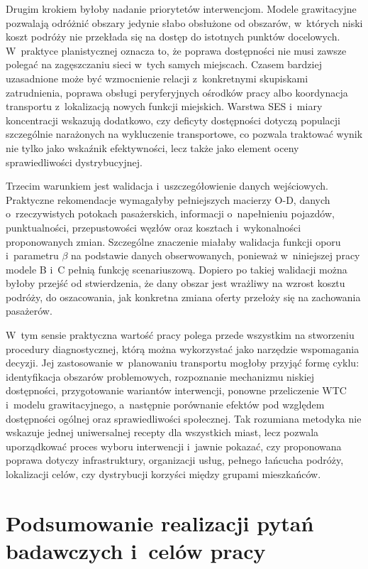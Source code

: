 \documentclass{pracamgr}
\begin{document}
Drugim krokiem byłoby nadanie priorytetów interwencjom. Modele grawitacyjne pozwalają odróżnić obszary jedynie słabo obsłużone od obszarów, w~których niski koszt podróży nie przekłada się na dostęp do istotnych punktów docelowych. W~praktyce planistycznej oznacza to, że poprawa dostępności nie musi zawsze polegać na zagęszczaniu sieci w~tych samych miejscach. Czasem bardziej uzasadnione może być wzmocnienie relacji z~konkretnymi skupiskami zatrudnienia, poprawa obsługi peryferyjnych ośrodków pracy albo koordynacja transportu z~lokalizacją nowych funkcji miejskich. Warstwa \mbox{SES} i~miary koncentracji wskazują dodatkowo, czy deficyty dostępności dotyczą populacji szczególnie narażonych na wykluczenie transportowe, co pozwala traktować wynik nie tylko jako wskaźnik efektywności, lecz także jako element oceny sprawiedliwości dystrybucyjnej.

Trzecim warunkiem jest walidacja i~uszczegółowienie danych wejściowych. Praktyczne rekomendacje wymagałyby pełniejszych macierzy \mbox{O-D}, danych o~rzeczywistych potokach pasażerskich, informacji o~napełnieniu pojazdów, punktualności, przepustowości węzłów oraz kosztach i~wykonalności proponowanych zmian. Szczególne znaczenie miałaby walidacja funkcji oporu i~parametru $\beta$ na podstawie danych obserwowanych, ponieważ w~niniejszej pracy modele B i~C pełnią funkcję scenariuszową. Dopiero po takiej walidacji można byłoby przejść od stwierdzenia, że dany obszar jest wrażliwy na wzrost kosztu podróży, do oszacowania, jak konkretna zmiana oferty przełoży się na zachowania pasażerów.

W~tym sensie praktyczna wartość pracy polega przede wszystkim na stworzeniu procedury diagnostycznej, którą można wykorzystać jako narzędzie wspomagania decyzji. Jej zastosowanie w~planowaniu transportu mogłoby przyjąć formę cyklu: identyfikacja obszarów problemowych, rozpoznanie mechanizmu niskiej dostępności, przygotowanie wariantów interwencji, ponowne przeliczenie \mbox{WTC} i~modelu grawitacyjnego, a~następnie porównanie efektów pod względem dostępności ogólnej oraz sprawiedliwości społecznej. Tak rozumiana metodyka nie wskazuje jednej uniwersalnej recepty dla wszystkich miast, lecz pozwala uporządkować proces wyboru interwencji i~jawnie pokazać, czy proponowana poprawa dotyczy infrastruktury, organizacji usług, pełnego łańcucha podróży, lokalizacji celów, czy dystrybucji korzyści między grupami mieszkańców.

\section{Podsumowanie realizacji pytań badawczych i~celów pracy}\label{section:ch5_podsumowanie_celow}
\end{document}
